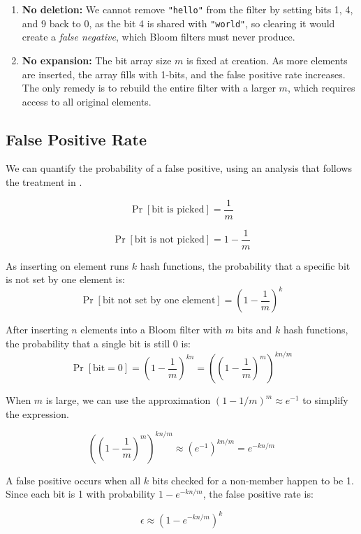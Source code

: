\begin{enumerate}
  \item \textbf{No deletion:} We cannot remove \texttt{"hello"} from the 
        filter by setting bits 1, 4, and 9 back to 0, as the bit 4 is shared 
        with \texttt{"world"}, so clearing it would create a 
        \emph{false negative}, which Bloom filters must never produce.
  \item \textbf{No expansion:} The bit array size $m$ is fixed at creation. 
        As more elements are inserted, the array fills with 1-bits, and 
        the false positive rate increases. The only remedy is to rebuild 
        the entire filter with a larger $m$, which requires access to all 
        original elements.
\end{enumerate}


\subsection{False Positive Rate}

We can quantify the probability of a false positive, using an analysis that follows the treatment in \cite{mitzenmacher}. 

\[
  \Pr[\text{bit is picked}] = \frac{1}{m}
\]

\[
  \Pr[\text{bit is not picked}] = 1 - \frac{1}{m}
\]

As inserting on element runs $k$ hash functions, the probability that a specific bit is not set by one element is:
\[
    \Pr[\text{bit not set by one element}] = \left(1 -
    \frac{1}{m}\right)^k
\]

After inserting $n$ 
elements into a Bloom filter with $m$ bits and $k$ hash functions, the 
probability that a single bit is still 0 is:
\[
  \Pr[\text{bit} = 0] = \left(1 - \frac{1}{m}\right)^{kn} = \left(\left(1 - \frac{1}{m}\right)^{m}\right)^{kn/m}
\]

When $m$ is large, we can use the approximation $(1 - 1/m)^m \approx e^{-1}$ to simplify the expression.

\[
\left(\left(1 - \frac{1}{m}\right)^{m}\right)^{kn/m} \approx (e^{-1})^{kn/m} = e^{-kn/m}
\]

A false positive occurs when all $k$ bits checked for a non-member happen 
to be 1. Since each bit is 1 with probability $1 - e^{-kn/m}$, the false 
positive rate is:

\begin{equation}
  \epsilon \approx \left(1 - e^{-kn/m}\right)^k
  \label{eq:bloom-fpr}
\end{equation}

